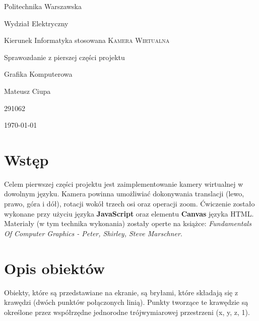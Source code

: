 \documentclass{article}
\begin{document}
\begin{titlepage}
    
    \begin{center}
        \Large
            Politechnika Warszawska 
        
            Wydział Elektryczny 
        
            Kierunek Informatyka stosowana
        \vfill
        \Huge \textsc{Kamera Wirtualna}
        
        \Large 
            Sprawozdanie z pierszej części projektu
        
            Grafika Komputerowa
    \end{center}
    \vfill



    \begin{center}
        \Large 
            Mateusz Ciupa
        
            291062
    \end{center}

    \begin{center}
        \Large	\today
    \end{center}

\end{titlepage}

\tableofcontents

\newpage

\section{Wstęp}

    Celem pierwszej części projektu jest zaimplementowanie kamery wirtualnej w dowolnym 
    języku. Kamera powinna umożliwiać dokonywania translacji (lewo, prawo, góra i dół), 
    rotacji wokół trzech osi oraz operacji zoom. Ćwiczenie zostało wykonane przy użyciu 
    języka \textbf{JavaScript} oraz elementu \textbf{Canvas} języka HTML. Materiały 
    (w tym technika wykonania) zostały operte na książce: \textit{Fundamentals Of Computer
    Graphics - Peter, Shirley, Steve Marschner}.

\section{Opis obiektów}

    Obiekty, które są przedstawiane na ekranie, są bryłami, które składają się z krawędzi
    (dwóch punktów połączonych linią). Punkty tworzące te krawędzie są określone przez
    współrzędne jednorodne trójwymiarowej przestrzeni (x, y, z, 1).
\end{document}
